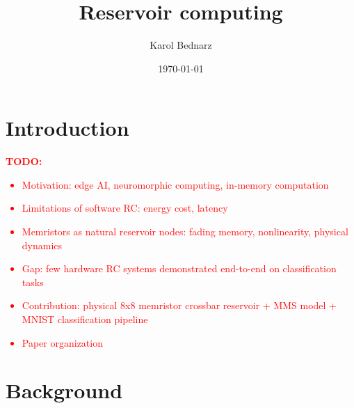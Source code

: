 \documentclass[11pt, oneside]{article}
\title{Reservoir computing}
\author{Karol Bednarz}
\date{\today}
\begin{document}
\maketitle
\tableofcontents

\vspace{.25in}

\newcommand{\Todo}[1]{\textcolor{red}{\textbf{TODO:} #1}}

\section{Introduction}
\Todo{
    \begin{itemize}
        \item Motivation: edge AI, neuromorphic computing, in-memory computation
        \item Limitations of software RC: energy cost, latency
        \item Memristors as natural reservoir nodes: fading memory, nonlinearity, physical dynamics
        \item Gap: few hardware RC systems demonstrated end-to-end on classification tasks
        \item Contribution: physical 8x8 memristor crossbar reservoir +  MMS model + MNIST classification pipeline
        \item Paper organization
    \end{itemize}
}


\section{Background}
\end{document}
